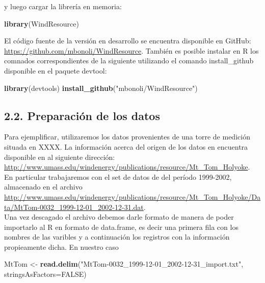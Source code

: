 \documentclass[]{article}
\newenvironment{Shaded}{\begin{snugshade}}{\end{snugshade}}
\newcommand{\KeywordTok}[1]{\textcolor[rgb]{0.13,0.29,0.53}{\textbf{{#1}}}}
\newcommand{\DataTypeTok}[1]{\textcolor[rgb]{0.13,0.29,0.53}{{#1}}}
\newcommand{\StringTok}[1]{\textcolor[rgb]{0.31,0.60,0.02}{{#1}}}
\newcommand{\OtherTok}[1]{\textcolor[rgb]{0.56,0.35,0.01}{{#1}}}
\newcommand{\NormalTok}[1]{{#1}}
\begin{document}
y luego cargar la librería en memoria:

\begin{Shaded}
\begin{Highlighting}[]
\KeywordTok{library}\NormalTok{(WindResource)}
\end{Highlighting}
\end{Shaded}

El código fuente de la versión en desarrollo se encuentra disponible en
GitHub: \url{https://github.com/mbonoli/WindResource}. También es
posible instalar en R los comnados correspondientes de la siguiente
utilizando el comando install\_github disponible en el paquete devtool:

\begin{Shaded}
\begin{Highlighting}[]
\KeywordTok{library}\NormalTok{(devtools)}
\KeywordTok{install_github}\NormalTok{(}\StringTok{"mbonoli/WindResource"}\NormalTok{)}
\end{Highlighting}
\end{Shaded}

\subsection{2.2. Preparación de los
datos}\label{preparacion-de-los-datos}

Para ejemplificar, utilizaremos los datos provenientes de una torre de
medición situada en XXXX. La información acerca del origen de los datos
en encuentra disponible en al siguiente dirección:
\href{http://www.umass.edu/windenergy/publications/resource/Mt_Tom_Holyoke}{\url{http://www.umass.edu/windenergy/publications/resource/Mt_Tom_Holyoke}}.
En particular trabajaremos con el set de datos de del período 1999-2002,
almacenado en el archivo
\href{http://www.umass.edu/windenergy/publications/resource/Mt_Tom_Holyoke/Data/MtTom-0032_1999-12-01_2002-12-31.dat}{\url{http://www.umass.edu/windenergy/publications/resource/Mt_Tom_Holyoke/Data/MtTom-0032_1999-12-01_2002-12-31.dat}}.\\Una
vez descagado el archivo debemos darle formato de manera de poder
importarlo al R en formato de data.frame, es decir una primera fila con
los nombres de las varibles y a continuación los registros con la
información propieamente dicha. En nuestro caso

\begin{Shaded}
\begin{Highlighting}[]
\NormalTok{MtTom <-}\StringTok{ }\KeywordTok{read.delim}\NormalTok{(}\StringTok{"MtTom-0032_1999-12-01_2002-12-31_import.txt"}\NormalTok{, }\DataTypeTok{stringsAsFactors=}\OtherTok{FALSE}\NormalTok{)}
\end{Highlighting}
\end{Shaded}
\end{document}
